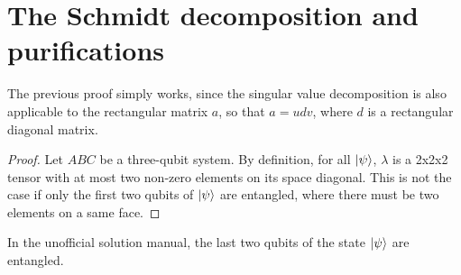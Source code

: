 \documentclass[../main.tex]{subfiles}
\begin{document}
\setcounter{chapter}{2}
\setcounter{section}{4}
\setcounter{exercise}{75}
\section{The Schmidt decomposition and purifications}

\begin{exercise}
\end{exercise}
The previous proof simply works, since the singular value decomposition is also applicable to the rectangular matrix $a$, so that $a=u d v$, where $d$ is a rectangular diagonal matrix. 

\bigskip
\begin{exercise}
\end{exercise}
\begin{proof}
    Let $ABC$ be a three-qubit system. By definition, for all $\ket{\psi}$, $\lambda$ is a 2x2x2 tensor with at most two non-zero elements on its space diagonal. This is not the case if only the first two qubits of $\ket{\psi}$ are entangled, where there must be two elements on a same face. 
\end{proof}
\begin{remark}
    In the unofficial solution manual, the last two qubits of the state $\ket{\psi}$ are entangled.
\end{remark}
\end{document}
